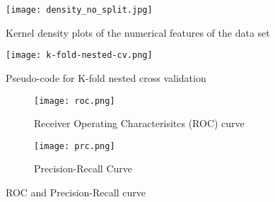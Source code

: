 \begin{figure}[ht]
    \centering
    \texttt{[image: density\_no\_split.jpg]}
    \caption{Kernel density plots of the numerical features of the data set}
    \label{fig:density}
\end{figure}
\begin{figure}[ht]
 \centering
 \texttt{[image: k-fold-nested-cv.png]}
 \caption{Pseudo-code for K-fold nested cross validation \cite{RN194}}
 \label{fig:cv}
\end{figure}
\begin{figure}
 \centering
 \begin{subfigure}{0.6\textwidth}
  \centering
  \texttt{[image: roc.png]}
  \caption{Receiver Operating Characterisitcs (ROC) curve}
  \label{fig:roc}
 \end{subfigure}
 \begin{subfigure}{0.6\textwidth}
  \centering
  \texttt{[image: prc.png]}
  \caption{Precision-Recall Curve}
  \label{fig:prc}
 \end{subfigure}
 \caption{ROC and Precision-Recall curve}
 \label{fig:prc-roc}
\end{figure}

